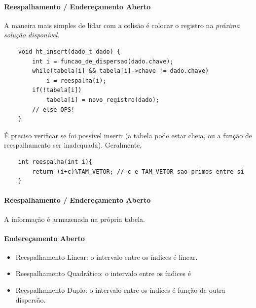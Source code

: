 \documentclass{UnBeamer}%
\begin{document}
	\begin{frame}[fragile,label=main]
		\framesubtitle{Reespalhamento / Endereçamento Aberto}

		A maneira mais simples de lidar com a colisão é colocar o registro na \emph{próxima solução disponível}.
		\pause
		\begin{center}
			\begin{minipage}{.8\textwidth}
				\begin{lstlisting}
	void ht_insert(dado_t dado) {
	    int i = funcao_de_dispersao(dado.chave);
	    while(tabela[i] && tabela[i]->chave != dado.chave)
	        i = reespalha(i);
	    if(!tabela[i])
	        tabela[i] = novo_registro(dado);
	    // else OPS!
	}
				\end{lstlisting}
			\end{minipage}
		\end{center}
		É preciso verificar se foi possível inserir (a tabela pode estar cheia,
		ou a função de reespalhamento ser inadequada). \pause Geralmente,
		\begin{lstlisting}
	int reespalha(int i){
	    return (i+c)%TAM_VETOR; // c e TAM_VETOR sao primos entre si
	}
		\end{lstlisting}
	\end{frame}

	\begin{frame}[label=notas]
		\framesubtitle{Reespalhamento / Endereçamento Aberto}

		A informação é armazenada na própria tabela.\\\vfill
	\end{frame}

	\begin{frame}
		\framesubtitle{Endereçamento Aberto}

		\begin{itemize}
			\item Reespalhamento Linear: o intervalo entre os índices é linear.
			\item Reespalhamento Quadrático: o intervalo entre os índices é
			\item Reespalhamento Duplo: o intervalo entre os índices é função de
			outra dispersão.
		\end{itemize}
	\end{frame}
\end{document}
